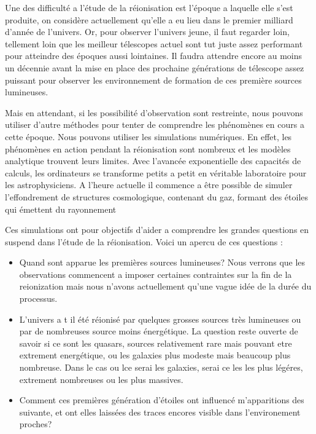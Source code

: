 Une des difficulté a l'étude de la réionisation est l'époque a laquelle elle s'est produite, on considère actuellement qu'elle a eu lieu dans le premier milliard d'année de l'univers.
Or, pour observer l'univers jeune, il faut regarder loin, tellement loin que les meilleur télescopes actuel sont tut juste assez performant pour atteindre des époques aussi lointaines.
Il faudra attendre encore au moins un décennie avant la mise en place des prochaine générations de télescope assez puissant pour observer les environnement de formation de ces première sources lumineuses.

Mais en attendant, si les possibilité d'observation sont restreinte, nous pouvons utiliser d'autre méthodes pour tenter de comprendre les phénomènes en cours a cette époque.
Nous pouvons utiliser les simulations numériques.
En effet, les phénomènes en action pendant la réionisation sont nombreux et les modèles analytique trouvent leurs limites.
Avec l'avancée exponentielle des capacités de calculs, les ordinateurs se transforme petits a petit en véritable laboratoire pour les astrophysiciens.
A l'heure actuelle il commence a être possible de simuler l'effondrement de structures cosmologique, contenant du gaz, formant des étoiles qui émettent du rayonnement 

Ces simulations ont pour objectifs d'aider a comprendre les grandes questions en suspend dans l'étude de la réionisation.
Voici un apercu de ces questions : 

\begin{itemize}
\item Quand sont apparue les premières sources lumineuses?
Nous verrons que les observations commencent a imposer certaines contraintes sur la fin de la reionization mais  nous n'avons actuellement qu'une vague idée de la durée du processus.

\item L'univers a t il été réionisé par quelques grosses sources très lumineuses ou par de nombreuses source moins énergétique.
La question reste ouverte de savoir si ce sont les quasars, sources relativement rare mais pouvant etre extrement energétique, ou les galaxies plus modeste mais beaucoup plus nombreuse.
Dans le cas ou lce serai les galaxies, serai ce les les plus légéres, extrement nombreuses ou les plus massives.

\item Comment ces premières génération d'étoiles ont influencé m'apparitions des suivante, et ont elles laissées des traces encores visible dans l'environement proches?

\end{itemize} 

